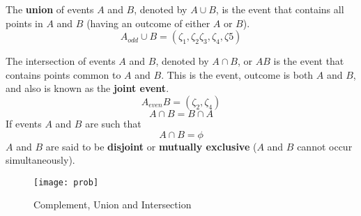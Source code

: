 \documentclass{article}
\begin{document}
    The \textbf{union} of events $A$ and $B$, denoted by $A \cup B$, is the event that contains all points
    in $A$ and $B$ (having an outcome of either $A$ or $B$).
    \begin{equation}
        A_{odd} \cup B = (\zeta_1, \zeta_2 \zeta_3, \zeta_4, \zeta5)
    \end{equation}

    The intersection of events $A$ and $B$, denoted by $A \cap B$, or $AB$ is the event that contains
    points common to $A$ and $B$. This is the event, outcome is both $A$ and $B$, and also is known as the
    \textbf{joint event}. 
    \begin{equation}
        A_{even}B = (\zeta_2, \zeta_4)
    \end{equation}
    \begin{equation}
        A \cap B = B \cap A
    \end{equation}
    If events $A$ and $B$ are such that 
    \begin{equation}
        A \cap B = \phi
    \end{equation}
    $A$ and $B$ are said to be \textbf{disjoint} or \textbf{mutually exclusive} ($A$ and $B$ cannot occur 
    simultaneously).

    \begin{figure}[h]
        \centering
        \texttt{[image: prob]}
        \caption{Complement, Union and Intersection}
    \end{figure}
\end{document}
